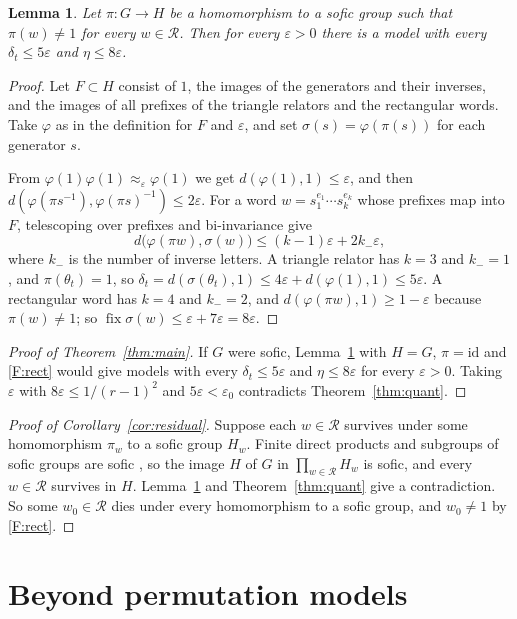 \documentclass[11pt]{article}
\newtheorem{lemma}[theorem]{Lemma}
\theoremstyle{definition}
\theoremstyle{remark}
\numberwithin{equation}{section}
\DeclareMathOperator{\fix}{fix}
\newcommand{\eps}{\varepsilon}
\newcommand{\cR}{\mathcal R}
\begin{document}
\begin{lemma}\label{lem:models}
Let $\pi:G\to H$ be a homomorphism to a sofic group such that $\pi(w)\ne1$ for every $w\in\cR$. Then for every $\eps>0$ there is a model with every $\delta_t\le5\eps$ and $\eta\le8\eps$.
\end{lemma}

\begin{proof}
Let $F\subset H$ consist of $1$, the images of the generators and their inverses, and the images of all prefixes of the triangle relators and the rectangular words. Take $\varphi$ as in the definition for $F$ and $\eps$, and set $\sigma(s)=\varphi(\pi(s))$ for each generator $s$.

From $\varphi(1)\varphi(1)\approx_\eps\varphi(1)$ we get $d(\varphi(1),1)\le\eps$, and then $d(\varphi(\pi s^{-1}),\varphi(\pi s)^{-1})\le2\eps$. For a word $w=s_1^{e_1}\cdots s_k^{e_k}$ whose prefixes map into $F$, telescoping over prefixes and bi-invariance give
\[
 d\bigl(\varphi(\pi w),\sigma(w)\bigr)\le(k-1)\eps+2k_-\eps,
\]
where $k_-$ is the number of inverse letters. A triangle relator has $k=3$ and $k_-=1$, and $\pi(\theta_t)=1$, so $\delta_t=d(\sigma(\theta_t),1)\le4\eps+d(\varphi(1),1)\le5\eps$. A rectangular word has $k=4$ and $k_-=2$, and $d(\varphi(\pi w),1)\ge1-\eps$ because $\pi(w)\ne1$; so $\fix\sigma(w)\le\eps+7\eps=8\eps$.
\end{proof}

\begin{proof}[Proof of Theorem~\ref{thm:main}]
If $G$ were sofic, Lemma~\ref{lem:models} with $H=G$, $\pi=\mathrm{id}$ and \ref{F:rect} would give models with every $\delta_t\le5\eps$ and $\eta\le8\eps$ for every $\eps>0$. Taking $\eps$ with $8\eps\le1/(r-1)^2$ and $5\eps<\eps_0$ contradicts Theorem~\ref{thm:quant}.
\end{proof}

\begin{proof}[Proof of Corollary~\ref{cor:residual}]
Suppose each $w\in\cR$ survives under some homomorphism $\pi_w$ to a sofic group $H_w$. Finite direct products and subgroups of sofic groups are sofic \cite[Theorem~1(1)]{ElekSzabo2006}, so the image $H$ of $G$ in $\prod_{w\in\cR}H_w$ is sofic, and every $w\in\cR$ survives in $H$. Lemma~\ref{lem:models} and Theorem~\ref{thm:quant} give a contradiction. So some $w_0\in\cR$ dies under every homomorphism to a sofic group, and $w_0\ne1$ by \ref{F:rect}.
\end{proof}

\section{Beyond permutation models}\label{sec:remarks}
\end{document}
